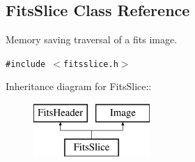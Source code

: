 \subsection{Fits\-Slice  Class Reference}
\label{class_fitsslice}
Memory saving traversal of a fits image. 


{\tt \#include $<$fitsslice.h$>$}

Inheritance diagram for Fits\-Slice::\begin{figure}[H]
\begin{center}
\leavevmode
\includegraphics[height=2cm]{class_fitsslice}
\end{center}
\end{figure}
